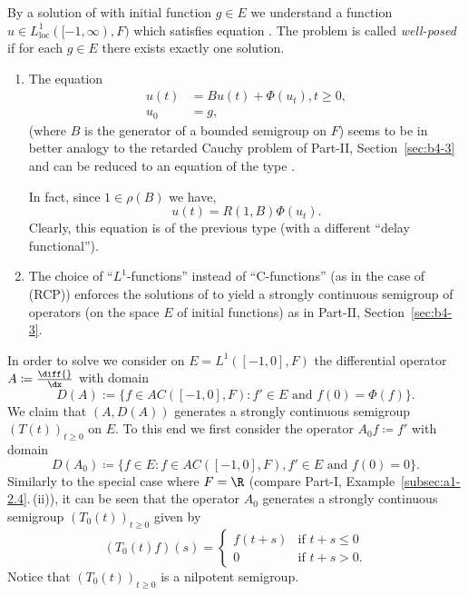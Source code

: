 By a solution of  with initial function $g \in E$ we understand a function $u \in L^{1}_{\mathrm{loc}}([-1,\infty),F)$ which satisfies equation .
The problem  is called \emph{well-posed} if for each $g \in E$ there exists exactly one solution.
\begin{remarks*}
\begin{enumerate}[\upshape (i), wide, labelindent=.25em] 
\item \label{rem:c4-kgk-1}
The equation
\begin{align*}
u(t) &= Bu(t) + \Phi(u_t), t \geq 0,\\
u_0 &= g,
\end{align*}
(where $B$ is the generator of a bounded semigroup on $F$) seems to be in better analogy to the retarded Cauchy problem of Part-II, Section~\ref{sec:b4-3} and can be reduced to an equation of the type .

In fact, since $1 \in \rho(B)$ we have,
\begin{equation*}\label{eq:c4-3.0-KGK1}
u(t) = R(1,B)\Phi(u_{t}).
\end{equation*}
Clearly, this equation is of the previous type (with a different \enquote{delay functional}).
\item \label{rem:c4-kgk-2}
The choice of \enquote{$L^{1}$-functions} instead of \enquote{C-functions} (as in the case of (RCP)) enforces the solutions of  to yield a strongly continuous semigroup of operators (on the space $E$ of initial functions) as in Part-II, Section~\ref{sec:b4-3}.
\end{enumerate}
\end{remarks*}
In order to solve  we consider on $E = L^{1}([-1,0],F)$ the differential operator $A \coloneq  \frac{\diff{}}{\dx}$ with domain
\begin{equation*}\label{eq:c4-3.0-KGK2}
D(A):=\{f \in AC([-1,0],F) \colon f' \in E \text{ and } f(0) = \Phi(f)\}.
\end{equation*}
We claim that $(A,D(A))$ generates a strongly continuous semigroup $(T(t))_{t\geq 0}$ on $E$.
To this end we first consider the operator $A_0 f \coloneqq f'$ with domain
\begin{equation*}\label{eq:c4-3.0-KGK3}
D(A_0) \coloneqq \{f \in E \colon f \in AC([-1,0],F), f' \in E \text{ and } f(0) = 0\}.
\end{equation*}
Similarly to the special case where $F = \R$ (compare Part-I, Example~\ref{subsec:a1-2.4}.\,(ii)), it can be seen that the operator $A_0$ generates a strongly continuous semigroup $(T_0(t))_{t\geq 0}$ given by
\begin{equation}\label{eq:c4-3.1}
(T_0(t)f)(s) = \begin{cases}
    f(t+s) & \text{if } t+s \leq 0 \\
    0 & \text{if } t+s > 0.
\end{cases}
\end{equation}
Notice that $(T_0(t))_{t \geq 0}$ is a nilpotent semigroup.

